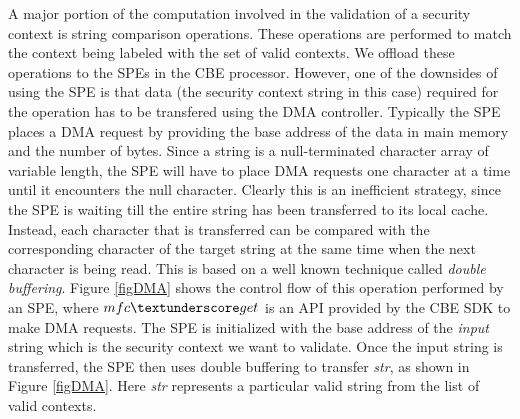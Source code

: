 \documentclass[conference]{IEEEtran}
\begin{document}
A major portion of the computation involved in the validation of a
security context is string comparison operations. These operations are performed to match the context being labeled with 
the set of valid contexts. We offload these operations to the SPEs in the CBE processor. However, one of the downsides of using the SPE is that data (the security context string in this case) required for the operation has to be transfered using the DMA controller. Typically the SPE places a DMA request by providing the base address 
of the data in main memory and the number of bytes. Since a string
is a null-terminated character array of variable length, the SPE will have 
to place DMA requests one character at a time until it
encounters the null character. Clearly this is an inefficient
strategy, since the SPE is waiting till the entire string has been transferred to its local cache. Instead, each character that is transferred can be compared with the corresponding character of the target string at the same time when the next character is being read. This is based on a well known technique called \emph{double buffering}. Figure \ref{figDMA}
shows the control flow of this operation performed by an SPE, where $mfc\textunderscore
get$ is an API provided by the CBE SDK to make DMA requests. The SPE is initialized with the base address of the \emph{input} string which is the security context we want to validate. Once the input string is transferred, the SPE then uses double buffering to transfer \emph{str}, as shown in Figure \ref{figDMA}.  Here \emph{str} represents a particular valid string from the list of valid
contexts.
\end{document}
